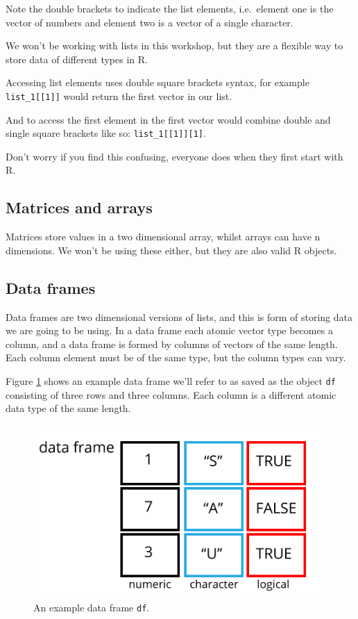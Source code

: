 \documentclass[12pt,]{book}
\begin{document}
Note the double brackets to indicate the list elements, i.e.~element one is the
vector of numbers and element two is a vector of a single character.

We won't be working with lists in this workshop, but they are a flexible way to
store data of different types in R.

Accessing list elements uses double square brackets syntax, for example
\texttt{list\_1{[}{[}1{]}{]}} would return the first vector in our list.

And to access the first element in the first vector would combine double and
single square brackets like so: \texttt{list\_1{[}{[}1{]}{]}{[}1{]}}.

Don't worry if you find this confusing, everyone does when they first start with
R.

\hypertarget{matrices-and-arrays}{%
\subsection{Matrices and arrays}\label{matrices-and-arrays}}

Matrices store values in a two dimensional array, whilst arrays can have n
dimensions. We won't be using these either, but they are also valid R objects.

\hypertarget{data-frames}{%
\subsection{Data frames}\label{data-frames}}

Data frames are two dimensional versions of lists, and this is form of storing
data we are going to be using. In a data frame each atomic vector type becomes
a column, and a data frame is formed by columns of vectors of the same length.
Each column element must be of the same type, but the column types can vary.

Figure \ref{fig:df} shows an example data frame we'll refer to as
saved as the object \texttt{df} consisting of three rows and three columns. Each
column is a different atomic data type of the same length.



\begin{figure}

{\centering \includegraphics[width=0.8\linewidth]{img/data_frame} 

}

\caption{An example data frame \texttt{df}.}\label{fig:df}
\end{figure}
\end{document}
